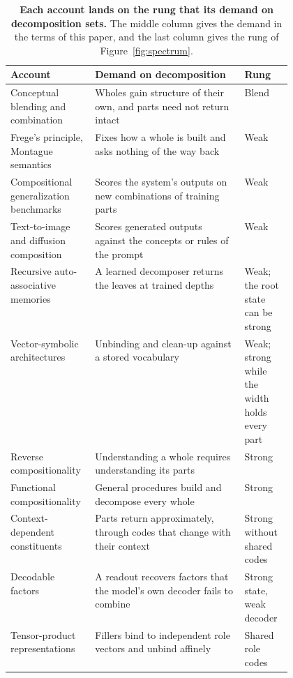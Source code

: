 \begin{table}[t]
  \caption{\textbf{Each account lands on the rung that its demand on decomposition sets.} The middle column gives the demand in the terms of this paper, and the last column gives the rung of Figure~\ref{fig:spectrum}.}
  \label{tab:spectrum}
  \centering\small
  \begin{tabularx}{\linewidth}{@{}P{0.30\linewidth}YP{0.17\linewidth}@{}}
    \toprule
    Account & Demand on decomposition & Rung \\
    \midrule
    Conceptual blending and combination \citep{fauconnier2002,osherson1981,kamp1995} & Wholes gain structure of their own, and parts need not return intact & Blend \\
    \addlinespace
    Frege's principle, Montague semantics \citep{frege1923,montague1970} & Fixes how a whole is built and asks nothing of the way back & Weak \\
    Compositional generalization benchmarks \citep{lake2018,keysers2020,hupkes2020,lake2023} & Scores the system's outputs on new combinations of training parts & Weak \\
    Text-to-image and diffusion composition \citep{ramesh2021,okawa2023,favero2025diffusion} & Scores generated outputs against the concepts or rules of the prompt & Weak \\
    Recursive auto-associative memories \citep{pollack1990} & A learned decomposer returns the leaves at trained depths & Weak; the root state can be strong \\
    Vector-symbolic architectures \citep{plate1995,gayler2006,kanerva2009} & Unbinding and clean-up against a stored vocabulary & Weak; strong while the width holds every part \\
    \addlinespace
    Reverse compositionality \citep{fodor2002} & Understanding a whole requires understanding its parts & Strong \\
    Functional compositionality \citep{vangelder1990} & General procedures build and decompose every whole & Strong \\
    Context-dependent constituents \citep{smolensky1988} & Parts return approximately, through codes that change with their context & Strong without shared codes \\
    Decodable factors \citep{montero2021} & A readout recovers factors that the model's own decoder fails to combine & Strong state, weak decoder \\
    \addlinespace
    Tensor-product representations \citep{smolensky1990} & Fillers bind to independent role vectors and unbind affinely & Shared role codes \\

\end{tabularx}
\end{table}
